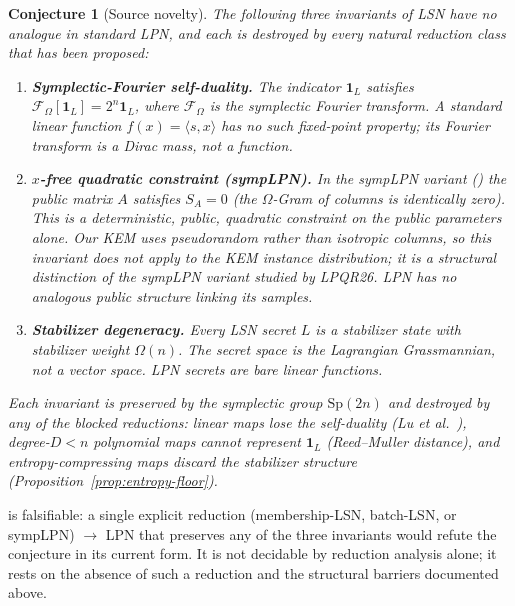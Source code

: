 \documentclass[11pt,a4paper]{article}
\theoremstyle{plain}
\newtheorem{conjecture}[theorem]{Conjecture}
\theoremstyle{definition}
\newcommand{\etal}{\textit{et al.}}
\begin{document}
\begin{conjecture}[Source novelty]
\label{conj:source}
The following three invariants of LSN have no analogue in standard LPN, and each is destroyed by every natural reduction class that has been proposed:
\begin{enumerate}
\item \textbf{Symplectic-Fourier self-duality.} The indicator $\mathbf{1}_L$ satisfies $\mathcal{F}_\Omega[\mathbf{1}_L] = 2^n \mathbf{1}_L$, where $\mathcal{F}_\Omega$ is the symplectic Fourier transform. A standard linear function $f(x)=\langle s,x\rangle$ has no such fixed-point property; its Fourier transform is a Dirac mass, not a function.
\item \textbf{$x$-free quadratic constraint (sympLPN).} In the sympLPN variant () the public matrix $A$ satisfies $S_A=0$ (the $\Omega$-Gram of columns is identically zero). This is a deterministic, public, quadratic constraint on the \emph{public parameters} alone. Our KEM uses pseudorandom rather than isotropic columns, so this invariant does not apply to the KEM instance distribution; it is a structural distinction of the sympLPN variant studied by LPQR26. LPN has no analogous public structure linking its samples.
\item \textbf{Stabilizer degeneracy.} Every LSN secret $L$ is a stabilizer state with stabilizer weight $\Omega(n)$. The secret space is the Lagrangian Grassmannian, not a vector space. LPN secrets are bare linear functions.
\end{enumerate}
Each invariant is preserved by the symplectic group $\mathrm{Sp}(2n)$ and destroyed by any of the blocked reductions: linear maps lose the self-duality (Lu \etal\ \cite{LPQR26}), degree-$D<n$ polynomial maps cannot represent $\mathbf{1}_L$ (Reed--Muller distance), and entropy-compressing maps discard the stabilizer structure (Proposition~\ref{prop:entropy-floor}).
\end{conjecture}

 is falsifiable: a single explicit reduction (membership-LSN, batch-LSN, or sympLPN) $\to$ LPN that preserves any of the three invariants would refute the conjecture in its current form. It is not decidable by reduction analysis alone; it rests on the absence of such a reduction and the structural barriers documented above.
\end{document}
